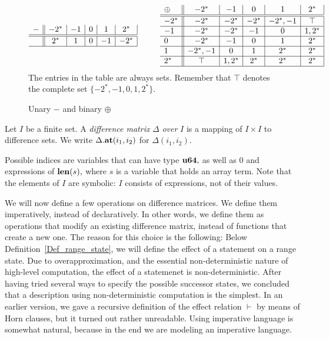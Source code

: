 \begin{figure}
   \caption{Unary $-$ and binary $ \oplus $}
   \label{Fig_negation_oplus}
   \[
      \begin{array}{l||c|c|c|c|c|}
         - & -2^{*} & -1 & 0 & 1 & 2^{*} \\
         \hline
         \hline
         & 2^{*} & 1 & 0 & -1 & -2^{*} \\
         \hline
      \end{array}
      \hspace*{1.0cm}
      \begin{array}{l||c|c|c|c|c|}
         \oplus & -2^{*} & -1 & 0 & 1 & 2^{*} \\
         \hline
         \hline
         -2^{*} & -2^{*} & -2^{*} & -2^{*} & -2^{*},-1 & \top \\
         \hline
         -1 & -2^{*} & -2^{*} & -1 & 0 & 1, 2^{*} \\
         \hline
         0 & -2^{*} & -1 & 0 & 1 & 2^{*} \\
         \hline
         1 & -2^{*}, -1 & 0 & 1 & 2^{*} & 2^{*} \\
         \hline
         2^{*} & \top & 1, 2^{*} & 2^{*} & 2^{*} & 2^{*} \\
         \hline
      \end{array}
   \]
   The entries in the table are always sets. Remember that $ \top $ denotes
   the complete set $ \{ -2^{*}, -1, 0, 1, 2^{*} \}. $
\end{figure}
\begin{definition}
   Let $ I $ be a finite set.
   A \emph{difference matrix} $ \Delta $ \emph{over} $ I $
   is a mapping of $ I \times I $ to
   difference sets.
   We write $ \Delta.{\bf at}(i_1,i_2) $ for
   $ \Delta(i_1,i_2). $
\end{definition}

Possible indices are variables that can have type $ {\bf u64}, $
as well as $ 0 $ and expressions of $ {\bf len}(s), $ where
$ s $ is a variable that holds an array term.
Note that the elements of $ I $ are symbolic: $ I $ consists
of expressions, not of their values.

We will now define a few operations on difference matrices.
We define them imperatively, instead of declaratively.
In other words, we define them as operations that modify
an existing difference matrix, instead of functions
that create a new one.
The reason for this choice is the following:
Below Definition~\ref{Def_range_state},
we will define the effect of a statement on a range state.
Due to overapproximation, and
the essential non-deterministic nature of high-level computation,
the effect of a statemenet is non-deterministic.
After having tried several
ways to specify the possible successor states, we concluded that
a description using non-deterministic computation is the simplest.
In an earlier version, we gave a recursive definition of the 
effect relation $ \vdash $ by means of Horn clauses,
but it turned out rather unreadable. Using imperative language
is somewhat natural, because in the end we are modeling an imperative
language.  

